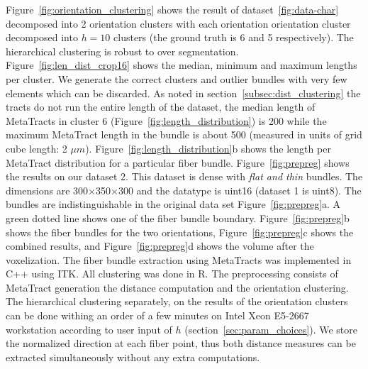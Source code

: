 Figure~\ref{fig:orientation_clustering} shows the result of dataset~\ref{fig:data-char} decomposed into 2 orientation clusters with each orientation orientation cluster decomposed into $h=10$ clusters (the ground truth is 6 and 5 respectively). The hierarchical clustering is robust to over segmentation.
Figure~\ref{fig:len_dist_crop16} shows the median, minimum and maximum lengths per cluster. We generate the correct clusters and outlier bundles with very few elements which can be discarded. As noted in section~\ref{subsec:dist_clustering} the tracts do not run the entire length of the dataset, the median length of MetaTracts in cluster 6 (Figure~\ref{fig:length_distribution}) is 200 while the maximum MetaTract length in the bundle is about 500 (measured in units of grid cube length: 2 $\mu m$). Figure~\ref{fig:length_distribution}b shows the length per MetaTract distribution for a particular fiber bundle. 
Figure~\ref{fig:prepreg} shows the results on our dataset 2. This dataset is dense with \textit{flat and thin} bundles. The dimensions are 300$\times$350$\times$300 and the datatype is uint16 (dataset 1 is uint8). The bundles are indistinguishable in the original data set Figure~\ref{fig:prepreg}a. A green dotted line shows one of the fiber bundle boundary. Figure~\ref{fig:prepreg}b shows the fiber bundles for the two orientations, Figure~\ref{fig:prepreg}c shows the combined results, and Figure~\ref{fig:prepreg}d shows the volume after the voxelization.
The fiber bundle extraction using MetaTracts was implemented in C++ using ITK. All clustering was done in R. The preprocessing consists of MetaTract generation the distance computation and the orientation clustering. The hierarchical clustering separately, on the results of the orientation clusters can be done withing an order of a few minutes on Intel Xeon E5-2667 workstation according to user input of $h$ (section~\ref{sec:param_choices}). We store the normalized direction at each fiber point, thus both distance measures can be extracted simultaneously without any extra computations.



